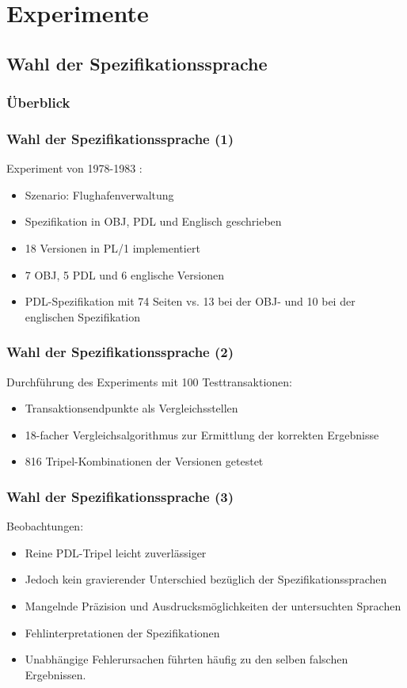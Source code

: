 \section{Experimente}
%
\subsection{Wahl der Spezifikationssprache}
%
%
\begin{frame}
	\frametitle{Überblick}
	\tableofcontents[currentsubsection]
\end{frame}
%
\begin{frame}
	\frametitle{Wahl der Spezifikationssprache (1)}
	Experiment von 1978-1983 \cite{Avizienis:1984:FTD:1319725.1320045}:
	\begin{itemize}
		\item Szenario: Flughafenverwaltung
		\item Spezifikation in OBJ, PDL und Englisch geschrieben
		\item 18 Versionen in PL/1 implementiert
		\item 7 OBJ, 5 PDL und 6 englische Versionen
		\item PDL-Spezifikation mit 74 Seiten vs. 13 bei der OBJ- und 10 bei der englischen Spezifikation
	\end{itemize}
	
\end{frame}
%
%
\begin{frame}
	\frametitle{Wahl der Spezifikationssprache (2)}
	Durchführung des Experiments mit 100 Testtransaktionen:
	\begin{itemize}
		\item Transaktionsendpunkte als Vergleichsstellen
		\item 18-facher Vergleichsalgorithmus zur Ermittlung der korrekten Ergebnisse
		\item 816 Tripel-Kombinationen der Versionen getestet
	\end{itemize}	
\end{frame}
%
%
\begin{frame}
	\frametitle{Wahl der Spezifikationssprache (3)}
	Beobachtungen:
	\begin{itemize}
	\item Reine PDL-Tripel leicht zuverlässiger
	\item Jedoch kein gravierender Unterschied bezüglich der Spezifikationssprachen
	\item Mangelnde Präzision und Ausdrucksmöglichkeiten der untersuchten Sprachen
	\item Fehlinterpretationen der Spezifikationen
	\item Unabhängige Fehlerursachen führten häufig zu den selben falschen Ergebnissen.
	\end{itemize}	
\end{frame}
%
%
